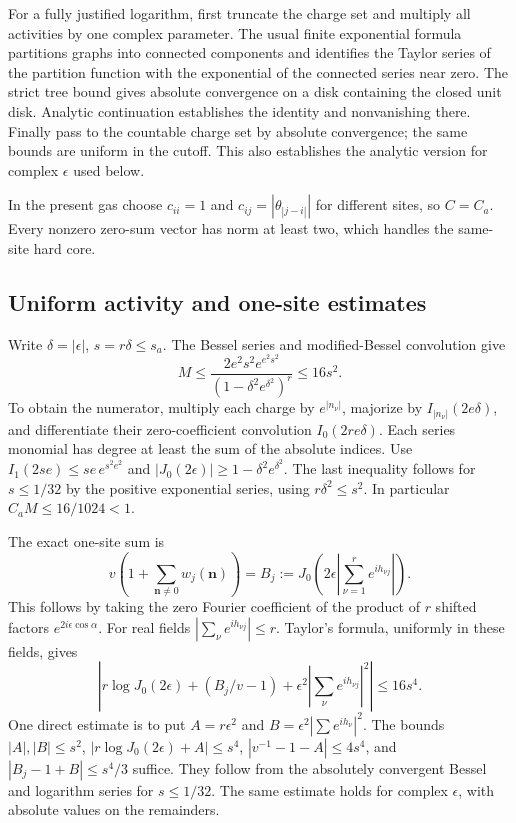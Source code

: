 For a fully justified logarithm, first truncate the charge set and multiply
all activities by one complex parameter. The usual finite exponential
formula partitions graphs into connected components and identifies the
Taylor series of the partition function with the exponential of the
connected series near zero. The strict tree bound gives absolute convergence
on a disk containing the closed unit disk. Analytic continuation establishes
the identity and nonvanishing there. Finally pass to the countable charge
set by absolute convergence; the same bounds are uniform in the cutoff.
This also establishes the analytic version for complex \(\epsilon\) used below.

In the present gas choose \(c_{ii}=1\) and
\(c_{ij}=|\theta_{|j-i|}|\) for different sites, so \(C=C_a\).
Every nonzero zero-sum vector has norm at least two, which handles
the same-site hard core.

\hypertarget{uniform-activity-and-one-site-estimates}{%
\subsection{Uniform activity and one-site estimates}\label{uniform-activity-and-one-site-estimates}}

Write \(\delta=|\epsilon|\), \(s=r\delta\le s_a\).
The Bessel series and modified-Bessel convolution give
\[
 M\le
 \frac{2e^2s^2e^{e^2s^2}}
            {(1-\delta^2e^{\delta^2})^r}
 \le16s^2.                                                 \tag{Ret.G12}
\]
To obtain the numerator, multiply each charge by \(e^{|n_\nu|}\),
majorize by \(I_{|n_\nu|}(2e\delta)\), and differentiate their
zero-coefficient convolution \(I_0(2re\delta)\).
Each series monomial has degree at least the sum of the absolute indices.
Use \(I_1(2s e)\le se\,e^{s^2e^2}\) and
\(|J_0(2\epsilon)|\ge1-\delta^2e^{\delta^2}\).
The last inequality follows for \(s\le1/32\) by the positive exponential
series, using \(r\delta^2\le s^2\).
In particular \(C_aM\le16/1024<1\).

The exact one-site sum is
\[
 v\left(1+\sum_{\boldsymbol n\ne0}w_j(\boldsymbol n)\right)
 =B_j:=J_0\left(2\epsilon
                 \left|\sum_{\nu=1}^r e^{ih_{\nu j}}\right|\right).
                                                               \tag{Ret.G13}
\]
This follows by taking the zero Fourier coefficient of the product of
\(r\) shifted factors \(e^{2i\epsilon\cos\alpha}\).
For real fields \(|\sum_\nu e^{ih_{\nu j}}|\le r\).
Taylor's formula, uniformly in these fields, gives
\[
 \left|r\log J_0(2\epsilon)
         +(B_j/v-1)
         +\epsilon^2\left|\sum_\nu e^{ih_{\nu j}}\right|^2
 \right|\le16s^4.                                         \tag{Ret.G14}
\]
One direct estimate is to put
\(A=r\epsilon^2\) and \(B=\epsilon^2|\sum e^{ih_\nu}|^2\).
The bounds \(|A|,|B|\le s^2\),
\(|r\log J_0(2\epsilon)+A|\le s^4\),
\(|v^{-1}-1-A|\le4s^4\), and
\(|B_j-1+B|\le s^4/3\) suffice.
They follow from the absolutely convergent Bessel and logarithm series
for \(s\le1/32\). The same estimate holds for complex \(\epsilon\),
with absolute values on the remainders.

